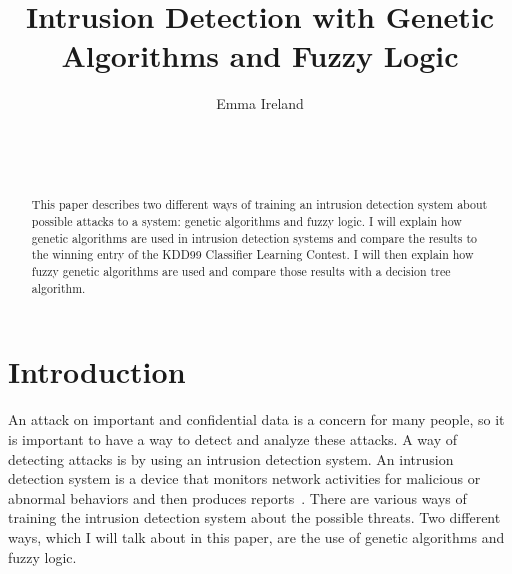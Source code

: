 \documentclass{sig-alternate}
\begin{document}

\title{Intrusion Detection with Genetic Algorithms and Fuzzy Logic}


\author{
\alignauthor
Emma Ireland\\
	\\
	\\
	\\
}

\maketitle
\begin{abstract}
This paper describes two different ways of training an intrusion detection system about possible attacks to a system: genetic algorithms and fuzzy logic. I will explain how genetic algorithms are used in intrusion detection systems and compare the results to the winning entry of the KDD99 Classifier Learning Contest. I will then explain how fuzzy genetic algorithms are used and compare those results with a decision tree algorithm.
\end{abstract}




\section{Introduction}
An attack on important and confidential data is a concern for many people, so it is important to have a way to detect and analyze these attacks. A way of detecting attacks is by using an intrusion detection system. An intrusion detection system is a device that monitors network activities for malicious or abnormal behaviors and then produces reports~\cite{DBLP:journals/corr/abs-1204-1336}. There are various ways of training the intrusion detection system about the possible threats. Two different ways, which I will talk about in this paper, are the use of genetic algorithms and fuzzy logic.
\end{document}
